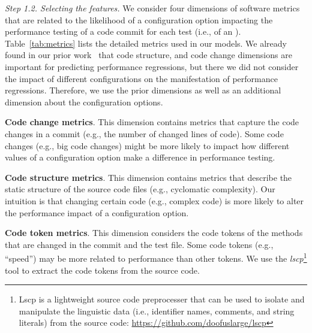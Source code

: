 \textit{Step 1.2. Selecting the features.}
We consider four dimensions of software metrics that are related to the likelihood of a configuration option impacting the performance testing of a code commit for each test (i.e., of an \instance). Table~\ref{tab:metrics} lists the detailed metrics used in our models. %
We already found in our prior work~\cite{jinfu_tse2020} that code structure, and code change dimensions are important for predicting performance regressions, but there we did not consider the impact of different configurations on the manifestation of performance regressions. Therefore, we use the prior dimensions as well as an additional dimension about the configuration options.

    \textbf{Code change metrics}. This dimension contains metrics that capture the code changes in a commit (e.g., the number of changed lines of code). Some code changes (e.g., big code changes) might be more likely to impact how different values of a configuration option make a difference in performance testing.
    
    \textbf{Code structure metrics}. This dimension contains metrics that describe the static structure of the source code files (e.g., cyclomatic complexity). %
    Our intuition is that changing certain code (e.g., complex code) is more likely to alter the performance impact of a configuration option.
    
    \textbf{Code token metrics}. This dimension considers the code tokens of the methods that are changed in the commit and the test file.%
    Some code tokens (e.g., ``speed'') may be more related to performance than other tokens. We use the \emph{lscp}\footnote{Lscp is a lightweight source code preprocesser that can be used to isolate and manipulate the linguistic data (i.e., identifier names, comments, and string literals) from the source code: \url{https://github.com/doofuslarge/lscp}} tool to extract the code tokens from the source code. 
    
